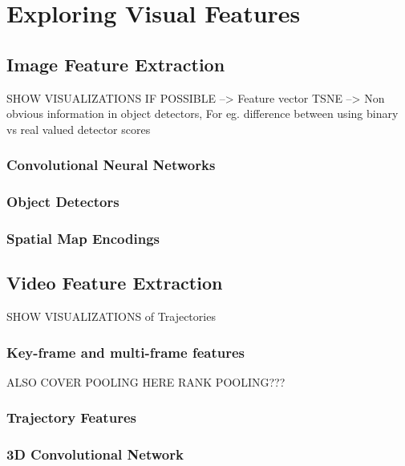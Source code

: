 \chapter{Exploring Visual Features}
\label{chapter:VisFeatChapter}
\section{Image Feature Extraction}
\label{sec:ImageFeat}

SHOW VISUALIZATIONS IF POSSIBLE
    --> Feature vector TSNE
    --> Non obvious information in object detectors, For eg. difference between
    using binary vs real valued detector scores
\subsection{Convolutional Neural Networks}
\subsection{Object Detectors}
\subsection{Spatial Map Encodings}

\section{Video Feature Extraction}
\label{sec:VideoFeat}

SHOW VISUALIZATIONS of Trajectories
\subsection{Key-frame and multi-frame features}
ALSO COVER POOLING HERE
RANK POOLING???
\subsection{Trajectory Features}
\subsection{3D Convolutional Network}
